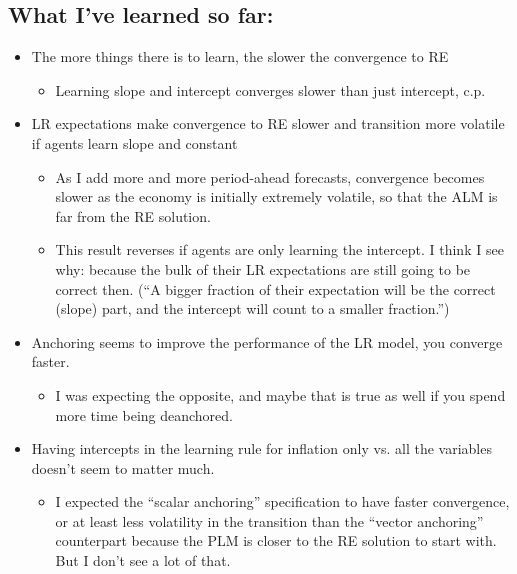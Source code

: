 \documentclass[11pt]{article}
\renewcommand{\[}{\begin{equation}}
\renewcommand{\]}{\end{equation}}
\begin{document}
\subsection{What I've learned so far:} 
\begin{itemize}
\item The more things there is to learn, the slower the convergence to RE
\begin{itemize}
\item Learning slope and intercept converges slower than just intercept, c.p.
\end{itemize}
\item LR expectations make convergence to RE slower and transition more volatile if agents learn slope and constant
\begin{itemize}
\item As I add more and more period-ahead forecasts, convergence becomes slower as the economy is initially extremely volatile, so that the ALM is far from the RE solution.
\item This result reverses if agents are only learning the intercept. I think I see why: because the bulk of their LR expectations are still going to be correct then. (``A bigger fraction of their expectation will be the correct (slope) part, and the intercept will count to a smaller fraction.'')
\end{itemize}
\item Anchoring seems to improve the performance of the LR model, you converge faster. 
\begin{itemize}
\item I was expecting the opposite, and maybe that is true as well if you spend more time being deanchored. 
\end{itemize}
\item Having intercepts in the learning rule for inflation only vs. all the variables doesn't seem to matter much.
\begin{itemize}
\item I expected the ``scalar anchoring'' specification to have faster convergence, or at least less volatility in the transition than the ``vector anchoring'' counterpart because the PLM is closer to the RE solution to start with. But I don't see a lot of that.
\end{itemize}
\end{itemize}
\end{document}

